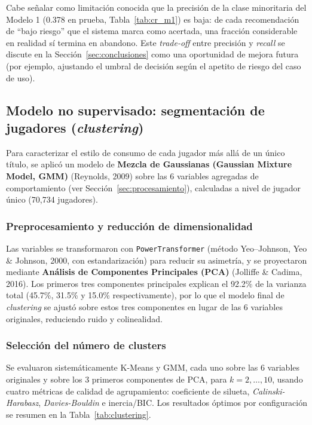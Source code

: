 \documentclass[11pt,letterpaper]{article}
\newcommand{\code}[1]{\texttt{\small #1}}
\begin{document}
Cabe señalar como limitación conocida que la precisión de la clase minoritaria del Modelo 1 (0.378 en prueba, Tabla~\ref{tab:cr_m1}) es baja: de cada recomendación de ``bajo riesgo'' que el sistema marca como acertada, una fracción considerable en realidad sí termina en abandono. Este \textit{trade-off} entre precisión y \textit{recall} se discute en la Sección~\ref{sec:conclusiones} como una oportunidad de mejora futura (por ejemplo, ajustando el umbral de decisión según el apetito de riesgo del caso de uso).

\subsection{Modelo no supervisado: segmentación de jugadores (\textit{clustering})}

Para caracterizar el estilo de consumo de cada jugador más allá de un único título, se aplicó un modelo de \textbf{Mezcla de Gaussianas (Gaussian Mixture Model, GMM)} (Reynolds, 2009) sobre las 6 variables agregadas de comportamiento (ver Sección~\ref{sec:procesamiento}), calculadas a nivel de jugador único (70{,}734 jugadores).

\subsubsection{Preprocesamiento y reducción de dimensionalidad}

Las variables se transformaron con \code{PowerTransformer} (método Yeo--Johnson, Yeo \& Johnson, 2000, con estandarización) para reducir su asimetría, y se proyectaron mediante \textbf{Análisis de Componentes Principales (PCA)} (Jolliffe \& Cadima, 2016). Los primeros tres componentes principales explican el 92.2\% de la varianza total (45.7\%, 31.5\% y 15.0\% respectivamente), por lo que el modelo final de \textit{clustering} se ajustó sobre estos tres componentes en lugar de las 6 variables originales, reduciendo ruido y colinealidad.

\subsubsection{Selección del número de clusters}

Se evaluaron sistemáticamente K-Means y GMM, cada uno sobre las 6 variables originales y sobre los 3 primeros componentes de PCA, para $k=2,\ldots,10$, usando cuatro métricas de calidad de agrupamiento: coeficiente de silueta, \textit{Calinski-Harabasz}, \textit{Davies-Bouldin} e inercia/BIC. Los resultados óptimos por configuración se resumen en la Tabla~\ref{tab:clustering}.
\end{document}
